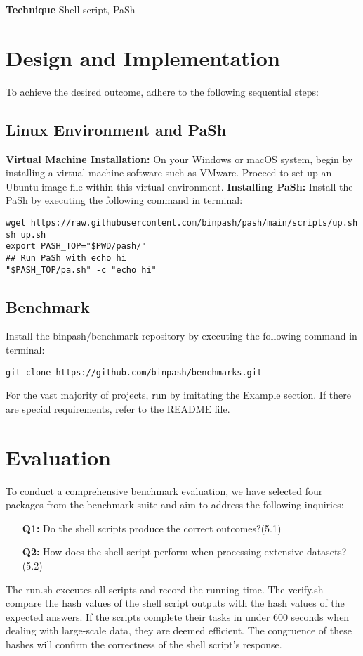 \documentclass[sigplan, screen, 10pt]{acmart}
\begin{document}
\textbf{Technique} Shell script, PaSh

\section{Design and Implementation}
\label{tec}
To achieve the desired outcome, adhere to the following sequential steps:
\subsection{Linux Environment and PaSh}
\textbf{Virtual Machine Installation:} On your Windows or macOS system, begin by installing a virtual machine software such as VMware. Proceed to set up an Ubuntu image file within this virtual environment.\newline
\textbf{Installing PaSh:} Install the PaSh by executing the following command in terminal:
\begin{verbatim}
wget https://raw.githubusercontent.com/binpash/pash/main/scripts/up.sh
sh up.sh
export PASH_TOP="$PWD/pash/"
## Run PaSh with echo hi
"$PASH_TOP/pa.sh" -c "echo hi"
\end{verbatim}
\subsection{Benchmark}
Install the binpash/benchmark repository by executing the following command in terminal:
\begin{verbatim}
git clone https://github.com/binpash/benchmarks.git
\end{verbatim}
For the vast majority of projects, run by imitating the Example section.
If there are special requirements, refer to the README file.


\section{Evaluation}
\label{eval}
To conduct a comprehensive benchmark evaluation, we have selected four packages from the benchmark suite and aim to address the following inquiries:
\begin{itemize}
\item[\textbf{Q1:}] Do the shell scripts produce the correct outcomes?(5.1)
\item[\textbf{Q2:}] How does the shell script perform when processing extensive datasets?(5.2)
\end{itemize}
The run.sh executes all scripts and record the running time.
The verify.sh compare the hash values of the shell script outputs with the hash values of the expected answers.
If the scripts complete their tasks in under 600 seconds when dealing with large-scale data, they are deemed efficient.
The congruence of these hashes will confirm the correctness of the shell script's response.
\end{document}
